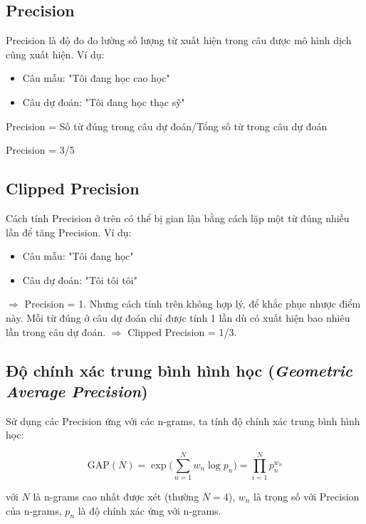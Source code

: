\documentclass[14pt, a4paper]{article}
\numberwithin{equation}{section}
\numberwithin{algorithm}{section}
\numberwithin{figure}{section}
\numberwithin{table}{section}
\numberwithin{dl}{section}
\numberwithin{md}{section}
\numberwithin{bd}{section}
\numberwithin{dn}{section}
\numberwithin{hq}{section}
\begin{document}
    \subsection{Precision}

    Precision là độ đo đo lường số lượng từ xuất hiện trong câu được mô hình dịch cũng xuất hiện. Ví dụ:

    \begin{itemize}
        \item Câu mẫu: "Tôi đang học cao học"
        \item Câu dự đoán: "Tôi đang học thạc sỹ"
    \end{itemize}

    Precision = Số từ đúng trong câu dự đoán/Tổng số từ trong câu dự đoán

    Precision = 3/5

    \subsection{Clipped Precision}

    Cách tính Precision ở trên có thể bị gian lận bằng cách lặp một từ đúng nhiều lần để tăng Precision. Ví dụ:

    \begin{itemize}
        \item Câu mẫu: "Tôi đang học"
        \item Câu dự đoán: "Tôi tôi tôi"
    \end{itemize}

    $\Rightarrow$ Precision = 1. Nhưng cách tính trên không hợp lý, để khắc phục nhược điểm này. Mỗi từ đúng ở câu dự đoán chỉ được tính 1 lần dù có xuất hiện bao nhiêu lần trong câu dự đoán.
    $\Rightarrow$ Clipped Precision = 1/3.

    \subsection{Độ chính xác trung bình hình học (\textit{Geometric Average Precision})}

    Sử dụng các Precision ứng với các n-grams, ta tính độ chính xác trung bình hình học:

    \begin{equation}
        \mathrm{GAP}(N)=\exp\big( \sum_{n=1}^N w_n \log p_n \big)=\prod_{i=1}^N p_n^{w_n}
    \end{equation}

    với $N$ là n-grams cao nhất được xét (thường $N=4$), $w_n$ là trọng số với Precision của n-grams, $p_n$ là độ chính xác ứng với n-grams.
\end{document}
